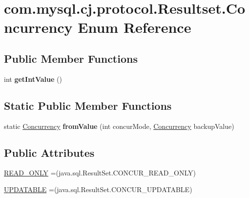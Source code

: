 \hypertarget{enumcom_1_1mysql_1_1cj_1_1protocol_1_1_resultset_1_1_concurrency}{}\section{com.\+mysql.\+cj.\+protocol.\+Resultset.\+Concurrency Enum Reference}
\label{enumcom_1_1mysql_1_1cj_1_1protocol_1_1_resultset_1_1_concurrency}
\subsection*{Public Member Functions}
\begin{DoxyCompactItemize}
\item 
\mbox{\label{enumcom_1_1mysql_1_1cj_1_1protocol_1_1_resultset_1_1_concurrency_a0d38fb89e8f1234351cc797970c86837}} 
int {\bfseries get\+Int\+Value} ()
\end{DoxyCompactItemize}
\subsection*{Static Public Member Functions}
\begin{DoxyCompactItemize}
\item 
\mbox{\label{enumcom_1_1mysql_1_1cj_1_1protocol_1_1_resultset_1_1_concurrency_a75596fc4df7c93acf786fe30f4befdd2}} 
static \mbox{\hyperlink{enumcom_1_1mysql_1_1cj_1_1protocol_1_1_resultset_1_1_concurrency}{Concurrency}} {\bfseries from\+Value} (int concur\+Mode, \mbox{\hyperlink{enumcom_1_1mysql_1_1cj_1_1protocol_1_1_resultset_1_1_concurrency}{Concurrency}} backup\+Value)
\end{DoxyCompactItemize}
\subsection*{Public Attributes}
\begin{DoxyCompactItemize}
\item 
\mbox{\hyperlink{enumcom_1_1mysql_1_1cj_1_1protocol_1_1_resultset_1_1_concurrency_ad95969aa1d11771ceb9081ea8447fc41}{R\+E\+A\+D\+\_\+\+O\+N\+LY}} =(java.\+sql.\+Result\+Set.\+C\+O\+N\+C\+U\+R\+\_\+\+R\+E\+A\+D\+\_\+\+O\+N\+LY)
\item 
\mbox{\hyperlink{enumcom_1_1mysql_1_1cj_1_1protocol_1_1_resultset_1_1_concurrency_a1bf39feaaedfbfc0722738fce73d919c}{U\+P\+D\+A\+T\+A\+B\+LE}} =(java.\+sql.\+Result\+Set.\+C\+O\+N\+C\+U\+R\+\_\+\+U\+P\+D\+A\+T\+A\+B\+LE)
\end{DoxyCompactItemize}


